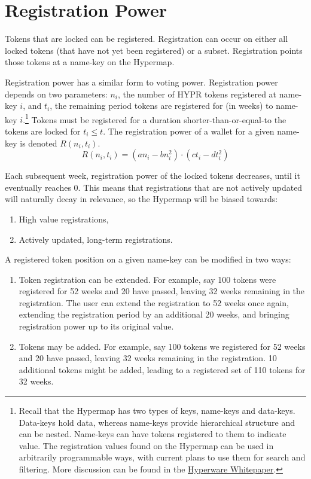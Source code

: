 \documentclass{article}
\begin{document}
\section{Registration Power}\label{sec:registration}

Tokens that are locked can be registered.
Registration can occur on either all locked tokens (that have not yet been registered) or a subset.
Registration points those tokens at a name-key on the Hypermap.

Registration power has a similar form to voting power.
Registration power depends on two parameters: $n_i$, the number of HYPR tokens registered at name-key $i$, and $t_i$, the remaining period tokens are registered for (in weeks) to name-key $i$.\footnote{
	Recall that the Hypermap has two types of keys, name-keys and data-keys.
	Data-keys hold data, whereas name-keys provide hierarchical structure and can be nested.
	Name-keys can have tokens registered to them to indicate value.
	The registration values found on the Hypermap can be used in arbitrarily programmable ways, with current plans to use them for search and filtering.
	More discussion can be found in the \href{https://hyperware.ai/whitepaper.pdf}{Hyperware Whitepaper}.
}
Tokens must be registered for a duration shorter-than-or-equal-to the tokens are locked for $t_i \leq t$.
The registration power of a wallet for a given name-key is denoted $R(n_i, t_i)$.
\begin{equation}
R(n_i, t_i) = (an_i - bn_i^2) \cdot (ct_i - dt_i^2)
\end{equation}

Each subsequent week, registration power of the locked tokens decreases, until it eventually reaches $0$.
This means that registrations that are not actively updated will naturally decay in relevance, so the Hypermap will be biased towards:
\begin{enumerate}
	\item High value registrations,
	\item Actively updated, long-term registrations.
\end{enumerate}

A registered token position on a given name-key can be modified in two ways:
\begin{enumerate}
    \item Token registration can be extended.
       For example, say 100 tokens were registered for 52 weeks and 20 have passed, leaving 32 weeks remaining in the registration.
       The user can extend the registration to 52 weeks once again, extending the registration period by an additional 20 weeks, and bringing registration power up to its original value.
    \item Tokens may be added.
       For example, say 100 tokens we registered for 52 weeks and 20 have passed, leaving 32 weeks remaining in the registration.
       10 additional tokens might be added, leading to a registered set of 110 tokens for 32 weeks.
\end{enumerate}
\end{document}
